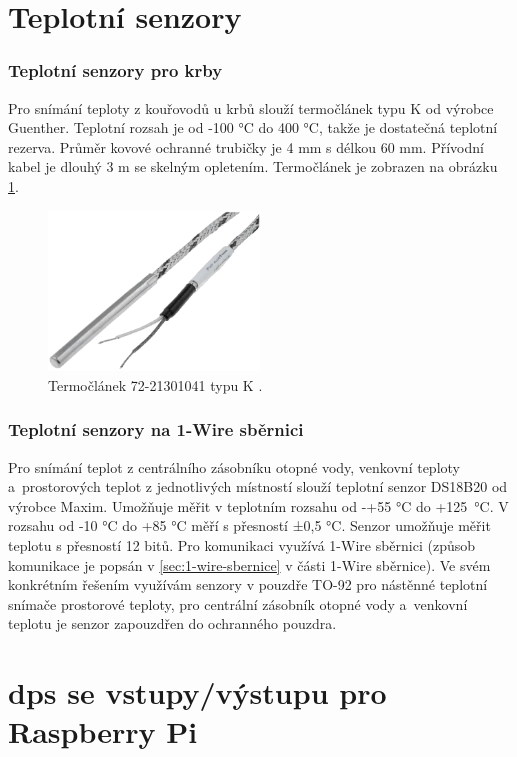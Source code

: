 \section{Teplotní senzory}
\subsubsection{Teplotní senzory pro krby}
\label{sec:teplotni-senzory-pro-krby}
Pro snímání teploty z kouřovodů u krbů slouží termočlánek typu K od výrobce Guenther. Teplotní rozsah je od -100 °C do 400 °C, takže je dostatečná teplotní rezerva. Průměr kovové ochranné trubičky je 4 mm s délkou 60 mm. Přívodní kabel je dlouhý 3 m se skelným opletením. Termočlánek je zobrazen na obrázku \ref{fig:termoclanek-72-21301041-k}.

\begin{figure}[H]
    \centering
    \includegraphics[width=0.5\textwidth]{images/termoclanek-72-21301041-k.png}
    \caption{Termočlánek 72-21301041 typu K \cite{termoclanek-k}.}
    \label{fig:termoclanek-72-21301041-k}
\end{figure}

\subsubsection{Teplotní senzory na 1-Wire sběrnici}
Pro snímání teplot z centrálního zásobníku otopné vody, venkovní teploty a~prostorových teplot z jednotlivých místností slouží teplotní senzor DS18B20 od výrobce Maxim. Umožňuje měřit
v teplotním rozsahu od -+55 °C do +125~°C. V rozsahu od -10 °C do +85 °C měří s přesností ±0,5 °C. Senzor umožňuje měřit teplotu s přesností 12 bitů. Pro komunikaci využívá 1-Wire sběrnici (způsob komunikace je popsán v \ref{sec:1-wire-sbernice} v části 1-Wire sběrnice). Ve svém konkrétním řešením využívám senzory v pouzdře TO-92 pro nástěnné teplotní snímače prostorové teploty, pro centrální zásobník otopné vody a~venkovní teplotu je senzor zapouzdřen do ochranného pouzdra.


\section{\acrshort{dps} se vstupy/výstupu pro Raspberry Pi}
\label{sec:dps-se-vstupy-vystupy-pro-raspberry-pi}

